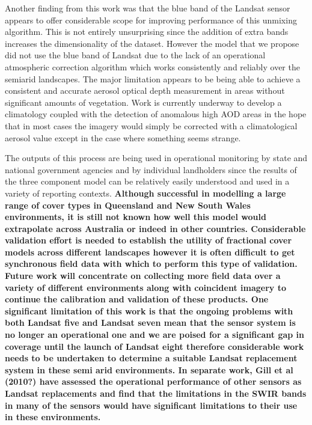 \documentclass[remotesensing,article,accept,moreauthors,pdftex,12pt,a4paper]{mdpi}
\begin{document}
Another finding from this work was that the blue band of the Landsat sensor appears to offer considerable scope for improving performance of this unmixing algorithm. This is not entirely unsurprising since the addition of extra bands increases the dimensionality of the dataset. However the model that we propose did not use the blue band of Landsat due to the lack of an operational atmospheric correction algorithm which works consistently and reliably over the semiarid landscapes. The major limitation appears to be being able to achieve a consistent and accurate aerosol optical depth measurement in areas without significant amounts of vegetation. Work is currently underway to develop a climatology coupled with the detection of anomalous high AOD areas in the hope that in most cases the imagery would simply be corrected with a climatological aerosol value except in the case where something seems strange.

The outputs of this process are being used in operational monitoring by state and national government agencies and by individual landholders since the results of the three component model can be relatively easily understood and used in a variety of reporting contexts.\textbf{ Although successful in modelling a large range of cover types in Queensland and New South Wales environments, it is still not known how well this model would extrapolate across Australia or indeed in other countries. Considerable validation effort is needed to establish the utility of fractional cover models across different landscapes however it is often difficult to get synchronous field data with which to perform this type of validation. Future work will concentrate on collecting more field data over a variety of different environments along with coincident imagery to continue the calibration and validation of these products. One significant limitation of this work is that the ongoing problems with both Landsat five and Landsat seven mean that the sensor system is no longer an operational one and we are poised for a significant gap in coverage until the launch of Landsat eight therefore considerable work needs to be undertaken to determine a suitable Landsat replacement system in these semi arid environments. In separate work, Gill et al (2010?) have assessed the operational performance of other sensors as Landsat replacements and find that the limitations in the SWIR bands in many of the sensors would have significant limitations to their use in these environments.}
\end{document}
